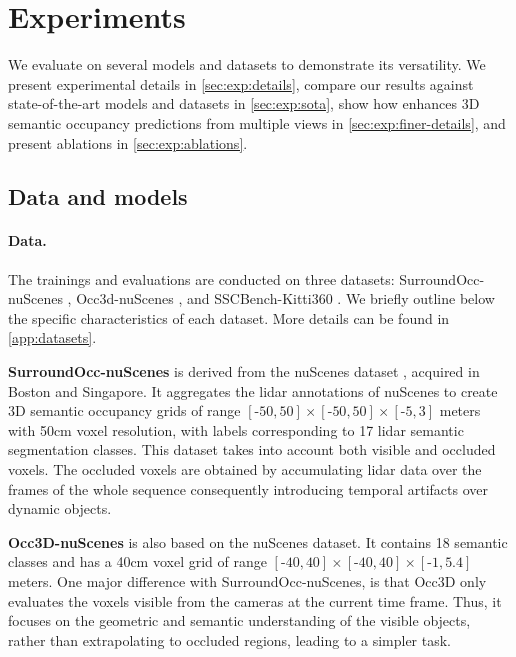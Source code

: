 \section{Experiments}
\label{sec:exp}

We evaluate \method{} on several models and datasets to demonstrate its versatility. We present experimental details in \autoref{sec:exp:details}, compare our results against state-of-the-art models and datasets in \autoref{sec:exp:sota}, show how \method{} enhances 3D semantic occupancy predictions from multiple views in \autoref{sec:exp:finer-details}, and present ablations in \autoref{sec:exp:ablations}.

\subsection{Data and models}
\label{sec:exp:details}

\paragraph{Data.}
The trainings and evaluations are conducted on three datasets: SurroundOcc-nuScenes \cite{wei2023surroundocc}, Occ3d-nuScenes \cite{tian2023occ3d}, and SSCBench-Kitti360 \cite{li2024sscbench}.
We briefly outline below the specific characteristics of each dataset. More details can be found in \autoref{app:datasets}.

\textbf{SurroundOcc-nuScenes} is derived from the nuScenes dataset \cite{caesar2020nuscenes}, acquired in Boston and Singapore. It aggregates the lidar annotations of nuScenes to create 3D semantic occupancy grids of range 
{$[\text{-}50,50] \! \times \! [\text{-}50,50] \! \times \! [\text{-}5,3]$ meters with 50cm voxel resolution}, 
with labels corresponding to 17 lidar semantic segmentation classes.
This dataset takes into account both visible and occluded voxels. The occluded voxels are obtained by accumulating lidar data over the frames of the whole sequence consequently introducing temporal artifacts over dynamic objects. 

\textbf{Occ3D-nuScenes} is also based on {the} nuScenes dataset. It contains 18 semantic classes and has 
{a 40cm voxel grid of range $[\text{-}40,40] \! \times \! [\text{-}40,40] \! \times \! [\text{-}1,5.4]$ meters.}
One major difference with SurroundOcc-nuScenes, is that Occ3D only evaluates the voxels visible from the cameras at the current time frame. Thus, it focuses on the geometric and semantic understanding of the visible objects, rather than extrapolating to occluded regions, leading to a simpler task.

